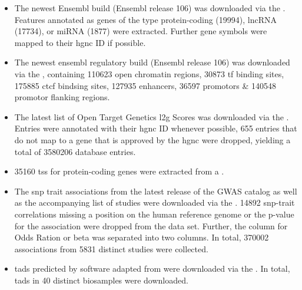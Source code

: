 \begin{itemize}
    \item {} The newest Ensembl build (Ensembl release 106) was downloaded via the . Features annotated as genes of the type protein-coding (19994), lncRNA (17734), or miRNA (1877) were extracted. Further gene symbols were mapped to their \ac{hgnc} ID if possible.

    \item {} The newest ensembl regulatory build (Ensembl release 106) was downloaded via the , containing 110623 open chromatin regions, 30873 \ac{tf} binding sites, 175885 \ac{ctcf} bindsing sites, 127935 enhancers, 36597 promotors \& 140548 promotor flanking regions.

    \item {} The latest list of Open Target Genetics \ac{l2g} Scores was downloaded via the . Entries were annotated with their \ac{hgnc} ID whenever possible, 655 entries that do not map to a gene that is approved by the \ac{hgnc} were dropped, yielding a total of 3580206 database entries.

    \item {} 35160 \ac{tss} for protein-coding genes were extracted from a .

    \item {} The \ac{snp} trait associations from the latest release of the GWAS catalog as well as the accompanying list of studies were downloaded via the . 14892 \ac{snp}-trait correlations missing a position on the human reference genome or the p-value for the association were dropped from the data set. Further, the column for Odds Ration or beta was separated into two columns. In total, 370002 associations from 5831 distinct studies were collected.

    \item {} \acp{tad} predicted by software adapted from \textcite{dixonTopologicalDomainsMammalian2012} were downloaded via the . In total, \acp{tad} in 40 distinct biosamples were downloaded.


\end{itemize}
